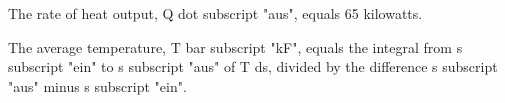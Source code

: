The rate of heat output, Q dot subscript "aus", equals 65 kilowatts.

The average temperature, T bar subscript "kF", equals the integral from s subscript "ein" to s subscript "aus" of T ds, divided by the difference s subscript "aus" minus s subscript "ein".